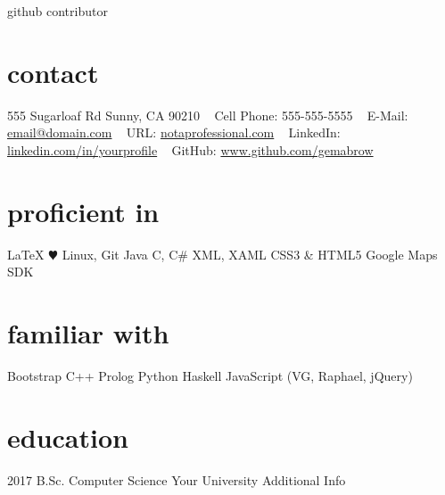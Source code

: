 \documentclass[]{friggeri-cv}
\begin{document}
       {github contributor}

\begin{aside}
  \section{contact}
    \hspace{-3em}555 Sugarloaf Rd
    Sunny, CA 90210 
    ~
    {Cell Phone: 555-555-5555} 
    ~ 
    E-Mail:
    \href{mailto:email@domain.com}{\hspace{-3em}email@domain.com}
    ~
    URL: \href{http://www.iamprofessional.com}{notaprofessional.com}
    ~ 
    LinkedIn:\hspace{-1em} \href{http://linkedin.com/in/thisguy}{\hspace{-3em}linkedin.com/in/yourprofile}
    ~
    GitHub: \href{http://www.github.com/gemabrow}{\hspace{-3em}www.github.com/gemabrow}
  \section{proficient in}
    \LaTeX
   {\color{red} $\varheartsuit$} %
    Linux, Git
    Java
    C, C\#
    XML, XAML
    CSS3 \& HTML5
    Google Maps SDK
  \section{familiar with}
    Bootstrap 
    C++
    Prolog
    Python
    Haskell
    JavaScript
    (VG, Raphael, jQuery)
\end{aside}
\section{education}
\begin{entrylist}
  \entry
    {2017}
    {B.Sc. {\normalfont Computer Science}}
    {Your University}
    {Additional Info} 
\end{entrylist}
\end{document}
